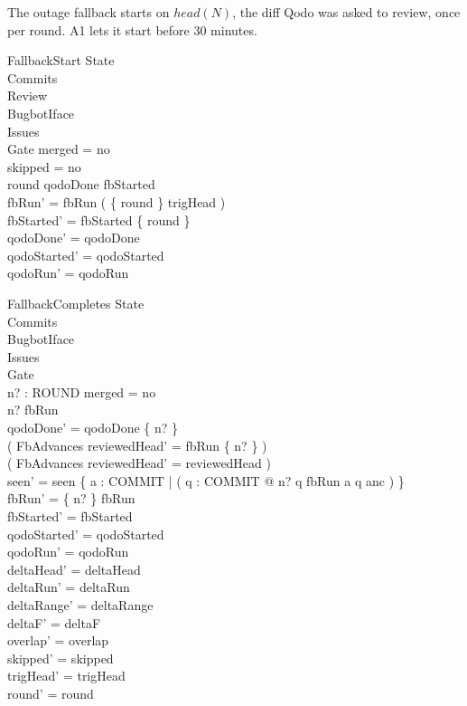 \documentclass{article}
\begin{document}
The outage fallback starts on $head(N)$, the diff Qodo was asked to review,
once per round. A1 lets it start before 30 minutes.

\begin{schema}{FallbackStart}
  \Delta State \\
  \Xi Commits \\
  \Xi Review \\
  \Xi BugbotIface \\
  \Xi Issues \\
  \Xi Gate
\where
  merged = no \\
  skipped = no \\
  round \notin qodoDone \cup fbStarted \\
  fbRun' = fbRun \cup ( \{ round \} \cross trigHead ) \\
  fbStarted' = fbStarted \cup \{ round \} \\
  qodoDone' = qodoDone \\
  qodoStarted' = qodoStarted \\
  qodoRun' = qodoRun
\end{schema}

\begin{schema}{FallbackCompletes}
  \Delta State \\
  \Xi Commits \\
  \Xi BugbotIface \\
  \Xi Issues \\
  \Xi Gate \\
  n? : ROUND
\where
  merged = no \\
  n? \in \dom fbRun \\
  qodoDone' = qodoDone \cup \{ n? \} \\
  ( FbAdvances \implies reviewedHead' = fbRun \limg \{ n? \} \rimg ) \\
  ( \lnot FbAdvances \implies reviewedHead' = reviewedHead ) \\
  seen' = seen \cup \{ a : COMMIT | ( \exists q : COMMIT @ n? \mapsto q \in fbRun \land a \mapsto q \in anc ) \} \\
  fbRun' = \{ n? \} \ndres fbRun \\
  fbStarted' = fbStarted \\
  qodoStarted' = qodoStarted \\
  qodoRun' = qodoRun \\
  deltaHead' = deltaHead \\
  deltaRun' = deltaRun \\
  deltaRange' = deltaRange \\
  deltaF' = deltaF \\
  overlap' = overlap \\
  skipped' = skipped \\
  trigHead' = trigHead \\
  round' = round
\end{schema}
\end{document}
